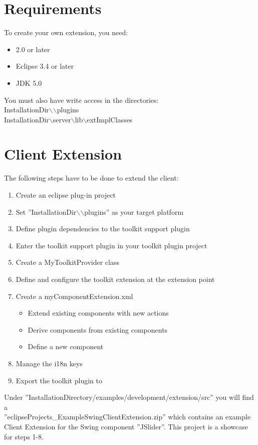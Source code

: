 \section{Requirements}
To create your own \app{} extension, you need:
\begin{itemize}
\item \app{} 2.0 or later
\item Eclipse 3.4 or later
\item JDK 5.0
\end{itemize}

You must also have write access in the directories:\\
InstallationDir$\backslash$\app{}$\backslash$plugins\\
InstallationDir$\backslash$server$\backslash$lib$\backslash$extImplClasses 

\section{\app{} Client Extension}

The following steps have to be done to extend the \app{} client:
\begin{enumerate}
 \item Create an eclipse plug-in project
 \item Set ''InstallationDir$\backslash$\app{}$\backslash$plugins'' as your target platform
 \item Define plugin dependencies to the toolkit support plugin
 \item Enter the toolkit support plugin in your toolkit plugin project
 \item Create a MyToolkitProvider class
 \item Define and configure the toolkit extension at the extension point
 \item Create a myComponentExtension.xml
 \begin{itemize}
  \item Extend existing \app{} components with new actions
  \item Derive components from existing \app{} components
  \item Define a new component
 \end{itemize}
 \item Manage the i18n keys
 \item Export the toolkit plugin to \app{}
\end{enumerate}

Under ''InstallationDirectory/examples/development/extension/src''
you will find a \\ ''eclipseProjects\_ExampleSwingClientExtension.zip'' which contains
 an example \app{} Client Extension for the Swing component ''JSlider''. This project 
 is a showcase for steps 1-8.
 
